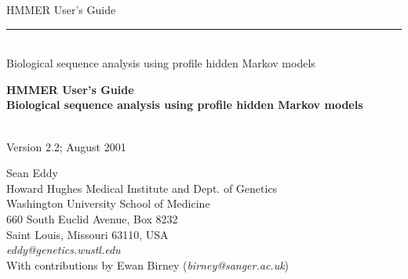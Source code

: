 \begin{titlepage}
{\Large

\vspace*{\fill}

\begin{latexonly}
\noindent
{\Huge \textsf{HMMER User's Guide}} \\ 
\rule[2pt]{\textwidth}{1pt} \\
\hspace*{\fill} {\large \textsf{Biological sequence analysis using
profile hidden Markov models} \\ }
\end{latexonly}

\begin{htmlonly}
\begin{center}
{\Huge \textbf{HMMER User's Guide}}\\
{\large \textbf{Biological sequence analysis using
profile hidden Markov models}}\\
\end{center}
\end{htmlonly}

\vspace*{\fill}

\begin{center}
\textsl{}\\
Version 2.2; August 2001 \\ 

\vspace*{\fill}

Sean Eddy\\
Howard Hughes Medical Institute and Dept. of Genetics\\
Washington University School of Medicine\\
660 South Euclid Avenue, Box 8232\\
Saint Louis, Missouri 63110, USA\\
\textsl{eddy@genetics.wustl.edu} \\
With contributions by Ewan Birney (\textsl{birney@sanger.ac.uk})\\
\end{center}

\vspace*{\fill}

}
\end{titlepage}
